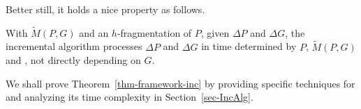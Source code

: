 Better still, it holds a nice property as follows.
\begin{theorem}
\label{thm-framework-inc}
With $\tilde{M}(P,G)$ and \fb \wrt an $h$-fragmentation of $P$, given $\Delta P$ and $\Delta G$,
the incremental algorithm \inc processes $\Delta P$ and $\Delta G$ in time
determined by $P$, $\tilde{M}(P,G)$ and \affballsx, not directly depending on $G$.
\end{theorem}

We shall prove Theorem~\ref{thm-framework-inc} by providing specific techniques for \inc and analyzing its time complexity in Section~\ref{sec-IncAlg}.








